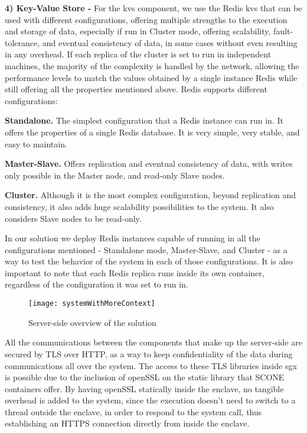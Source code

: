 \vspace{5mm} 

\textbf{4) Key-Value Store -}
For the \gls{kvs} component, we use the Redis \gls{kvs} that can be used with different configurations, offering multiple strengths to the execution and storage of data, especially if run in Cluster mode, offering scalability, fault-tolerance, and eventual consistency of data, in some cases without even resulting in any overhead. 
If each replica of the cluster is set to run in independent machines, the majority of the complexity is handled by the network, allowing the performance levels to match the values obtained by a single instance Redis while still offering all the properties mentioned above. Redis supports different configurations: 

\textbf{Standalone.} The simplest configuration that a Redis instance can run in. It offers the properties of a single Redis database. It is very simple, very stable, and easy to maintain.

\textbf{Master-Slave.} Offers replication and eventual consistency of data, with writes only possible in the Master node, and read-only Slave nodes.

\textbf{Cluster.} Although it is the most complex configuration, beyond replication and consistency, it also adds huge scalability possibilities to the system. It also considers Slave nodes to be read-only.

In our solution we deploy Redis instances capable of running in all the configurations mentioned - Standalone mode, Master-Slave, and Cluster - as a way to test the behavior of the system in each of those configurations. It is also important to note that each Redis replica runs inside its own container, regardless of the configuration it was set to run in. 

\vspace{5mm}

\begin{figure}[htbp]
	\centering
	{\texttt{[image: systemWithMoreContext]}}
	\caption{Server-side overview of the solution}
	\label{fig:serverside_systemModel}
\end{figure}

\vspace{5mm}
All the communications between the components that make up the server-side are secured by TLS over HTTP, as a way to keep confidentiality of the data during communications all over the system. The access to these TLS libraries inside \gls{sgx} is possible due to the inclusion of openSSL on the static library that SCONE containers offer. By having openSSL statically inside the enclave, no tangible overhead is added to the system, since the execution doesn't need to switch to a thread outside the enclave, in order to respond to the system call, thus establishing an HTTPS connection directly from inside the enclave. 

